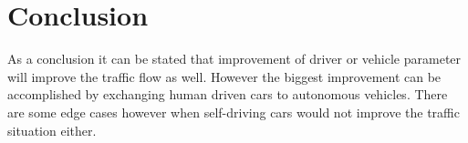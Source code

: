 	\section{Conclusion}
		As a conclusion it can be stated that improvement of driver or vehicle parameter will improve the traffic flow as well. However the biggest improvement can be accomplished by exchanging human driven cars to autonomous vehicles. There are some edge cases however when self-driving cars would not improve the traffic situation either.
